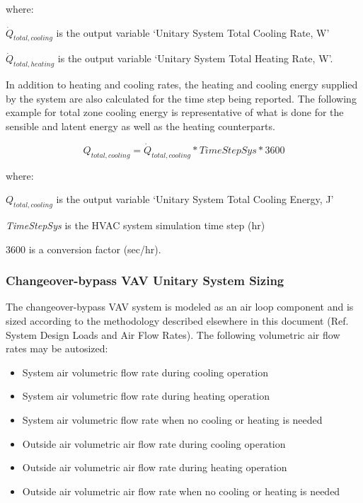 where:

\(\dot{Q}_{total,cooling}\) is the output variable `Unitary System Total Cooling Rate, W'

\(\dot{Q}_{total,heating}\) is the output variable `Unitary System Total Heating Rate, W'.

In addition to heating and cooling rates, the heating and cooling energy supplied by the system are also calculated for the time step being reported. The following example for total zone cooling energy is representative of what is done for the sensible and latent energy as well as the heating counterparts.

\begin{equation}
{Q_{total,cooling}} = {\dot Q_{total,cooling}}*TimeStepSys*3600
\end{equation}

where:

\(Q_{total,cooling}\) is the output variable `Unitary System Total Cooling Energy, J'

\emph{TimeStepSys} is the HVAC system simulation time step (hr)

3600 is a conversion factor (sec/hr).

\subsubsection{Changeover-bypass VAV Unitary System Sizing}\label{changeover-bypass-vav-unitary-system-sizing}

The changeover-bypass VAV system is modeled as an air loop component and is sized according to the methodology described elsewhere in this document (Ref. System Design Loads and Air Flow Rates). The following volumetric air flow rates may be autosized:

\begin{itemize}
\item System air volumetric flow rate during cooling operation
\item System air volumetric flow rate during heating operation
\item System air volumetric flow rate when no cooling or heating is needed
\item Outside air volumetric air flow rate during cooling operation
\item Outside air volumetric air flow rate during heating operation
\item Outside air volumetric air flow rate when no cooling or heating is needed
\end{itemize}

